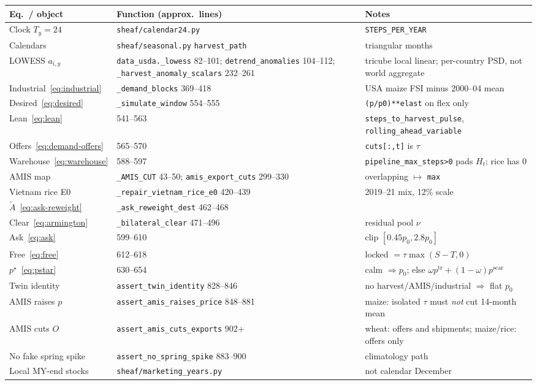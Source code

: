 \begin{center}
\small
\begin{tabular}{llp{}}
\toprule
Eq.\ / object & Function (approx.\ lines) & Notes \\
\midrule
Clock $T_y=24$ & \texttt{sheaf/calendar24.py} & \texttt{STEPS\_PER\_YEAR} \\
Calendars & \texttt{sheaf/seasonal.py} \texttt{harvest\_path} & triangular months \\
LOWESS $a_{i,y}$ & \texttt{data\_usda.\_lowess} 82--101;
\texttt{detrend\_anomalies} 104--112;
\texttt{\_harvest\_anomaly\_scalars} 232--261 & tricube local linear;
per-country PSD, not world aggregate \\
Industrial~\eqref{eq:industrial} & \texttt{\_demand\_blocks} 369--418 &
USA maize FSI minus 2000--04 mean \\
Desired~\eqref{eq:desired} & \texttt{\_simulate\_window} 554--555 &
\texttt{(p/p0)**elast} on flex only \\
Lean~\eqref{eq:lean} & 541--563 &
\texttt{steps\_to\_harvest\_pulse}, \texttt{rolling\_ahead\_variable} \\
Offers~\eqref{eq:demand-offers} & 565--570 &
\texttt{cuts[:,t]} is $\tau$ \\
Warehouse~\eqref{eq:warehouse} & 588--597 &
\texttt{pipeline\_max\_steps>0} pads $H_t$; rice has 0 \\
AMIS map & \texttt{\_AMIS\_CUT} 43--50;
\texttt{amis\_export\_cuts} 299--330 & overlapping $\mapsto$ \texttt{max} \\
Vietnam rice E0 & \texttt{\_repair\_vietnam\_rice\_e0} 420--439 &
2019--21 mix, 12\% scale \\
$\tilde A$~\eqref{eq:ask-reweight} & \texttt{\_ask\_reweight\_dest} 462--468 & \\
Clear~\eqref{eq:armington} & \texttt{\_bilateral\_clear} 471--496 &
residual pool $\nu$ \\
Ask~\eqref{eq:ask} & 599--610 & clip $[0.45p_0,2.8p_0]$ \\
Free~\eqref{eq:free} & 612--618 & locked $= \tau\max(S-T,0)$ \\
$p^\star$~\eqref{eq:pstar} & 630--654 & calm $\Rightarrow p_0$;
else $\omega p^{\mathrm{tr}}+(1-\omega)p^{\mathrm{scar}}$ \\
Twin identity & \texttt{assert\_twin\_identity} 828--846 &
no harvest/AMIS/industrial $\Rightarrow$ flat $p_0$ \\
AMIS raises $p$ & \texttt{assert\_amis\_raises\_price} 848--881 &
maize: isolated $\tau$ must \emph{not} cut 14-month mean \\
AMIS cuts $O$ & \texttt{assert\_amis\_cuts\_exports} 902+ &
wheat: offers and shipments; maize/rice: offers only \\
No fake spring spike & \texttt{assert\_no\_spring\_spike} 883--900 &
climatology path \\
Local MY-end stocks & \texttt{sheaf/marketing\_years.py} &
not calendar December \\
\bottomrule
\end{tabular}
\end{center}

